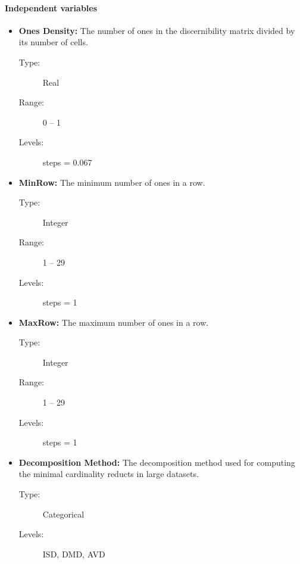 \documentclass[11pt]{article}   %
\begin{document}
  \paragraph{Independent variables}  
  	\begin{itemize}
  	   \item \textbf{Ones Density:} The number of ones in the discernibility matrix divided by its number of
  	   								 cells.
  	   		\begin{description}
  	   			\item[Type:] Real
  	   			\item[Range:] 0 -- 1
  	   			\item[Levels:] steps = 0.067
  	   		\end{description}
  	   \item \textbf{MinRow:} The minimum number of ones in a row.
  	   		\begin{description}
  	   			\item[Type:] Integer
  	   			\item[Range:] 1 -- 29
  	   			\item[Levels:] steps = 1
  	   		\end{description}
  	   \item \textbf{MaxRow:} The maximum number of ones in a row.
  	   		\begin{description}
  	   			\item[Type:] Integer
  	   			\item[Range:] 1 -- 29
  	   			\item[Levels:] steps = 1
  	   		\end{description}
  	   \item \textbf{Decomposition Method:} The decomposition method used for computing the minimal cardinality
  	   										reducts in large datasets.
  	   		\begin{description}
  	   			\item[Type:] Categorical
  	   			\item[Levels:] ISD, DMD, AVD
  	   		\end{description}
    \end{itemize}	
\end{document}
